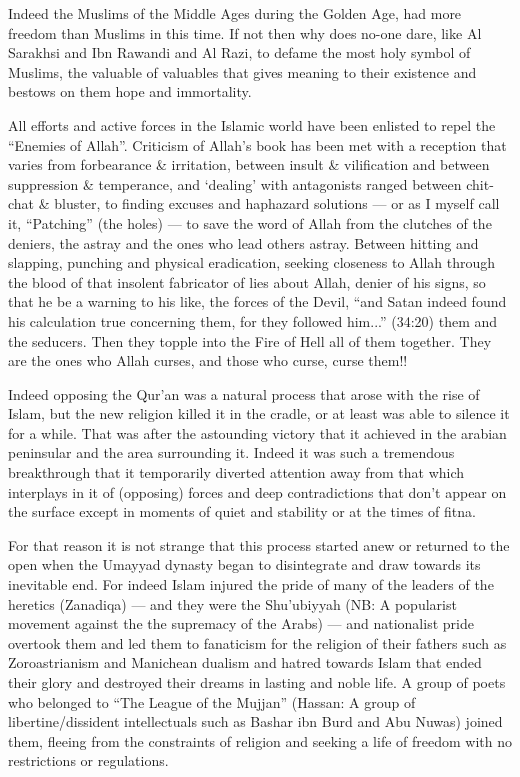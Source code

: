 \documentclass[12pt]{book}
\begin{document}
Indeed the Muslims of the Middle Ages during the Golden Age, had more freedom
than Muslims in this time. If not then why does no-one dare, like Al Sarakhsi
and Ibn Rawandi and Al Razi, to defame the most holy symbol of Muslims, the
valuable of valuables that gives meaning to their existence and bestows on them
hope and immortality.

All efforts and active forces in the Islamic world have been enlisted to repel
the “Enemies of Allah”. Criticism of Allah’s book has been met with a reception
that varies from forbearance \& irritation, between insult \& vilification and
between suppression \& temperance, and ‘dealing’ with antagonists ranged
between chit-chat \& bluster, to finding excuses and haphazard solutions — or as
I myself call it, “Patching” (the holes) — to save the word of Allah from the
clutches of the deniers, the astray and the ones who lead others astray.
Between hitting and slapping, punching and physical eradication, seeking
closeness to Allah through the blood of that insolent fabricator of lies about
Allah, denier of his signs, so that he be a warning to his like, the forces of
the Devil, “and Satan indeed found his calculation true concerning them, for
they followed him...” (34:20) them and the seducers. Then they topple into the
Fire of Hell all of them together\footnotemark. They are the ones who Allah
curses, and those who curse, curse them!!


Indeed opposing the Qur’an was a natural process that arose with the rise of
Islam, but the new religion killed it in the cradle, or at least was able to
silence it for a while. That was after the astounding victory that it achieved
in the arabian peninsular and the area surrounding it. Indeed it was such a
tremendous breakthrough that it temporarily diverted attention away from that
which interplays in it of (opposing) forces and deep contradictions that don’t
appear on the surface except in moments of quiet and stability or at the times
of fitna.

For that reason it is not strange that this process started anew or returned to
the open when the Umayyad dynasty began to disintegrate and draw towards its
inevitable end. For indeed Islam injured the pride of many of the leaders of
the heretics (Zanadiqa) — and they were the Shu’ubiyyah
(NB: A popularist movement against the the supremacy of the Arabs)
— and nationalist pride overtook them and led them to fanaticism for the
religion of their fathers such as Zoroastrianism and Manichean dualism and
hatred towards Islam that ended their glory and destroyed their dreams in
lasting and noble life. A group of poets who belonged to “The League of the
Mujjan” (Hassan: A group of libertine/dissident intellectuals such as Bashar
ibn Burd and Abu Nuwas) joined them, fleeing from the constraints of religion
and seeking a life of freedom with no restrictions or regulations.
\end{document}
